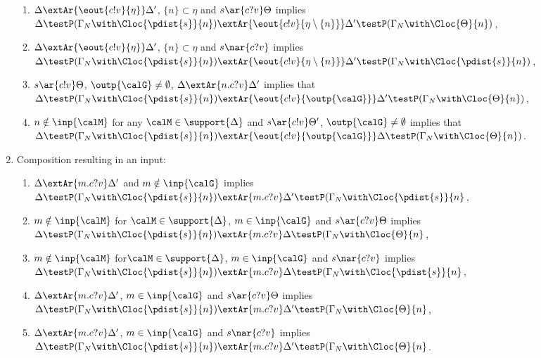 \documentclass{LMCS}
\begin{document}
\begin{prop}
\begin{enumerate}
\begin{enumerate}[label=(\roman*)]
\item $\Delta \extAr{\eout{c!v}{\eta}} \Delta'$, $ 
 \{n\} \subset \eta$  
  and $s \ar{c?v} \Theta$ 
  implies 
  $\Delta \testP (\Gamma_N \with \Cloc{\pdist{s}}{n}) 
  \extAr{\eout{c!v}{\eta \setminus \{n\}}} 
  \Delta' \testP (\Gamma_N \with \Cloc{\Theta}{n})$,

\item $\Delta \extAr{\eout{c!v}{\eta}} \Delta'$, $ 
 \{n\}  \subset \eta$  
  and $s \nar{c?v}$ 
  implies 
  $\Delta \testP (\Gamma_N \with \Cloc{\pdist{s}}{n}) 
  \extAr{\eout{c!v}{\eta \setminus \{n\}}} 
  \Delta' \testP (\Gamma_N \with \Cloc{\pdist{s}}{n})$,

\item $s \ar{c!v} \Theta$, $\outp{\calG} \neq \emptyset$, 
$\Delta \extAr{n.c?v} \Delta'$ implies that 
$\Delta \testP (\Gamma_N \with \Cloc{\pdist{s}}{n}) 
\extAr{\eout{c!v}{\outp{\calG}}} \Delta' \testP (\Gamma_N \with \Cloc{\Theta}{n})$, 

\item $n \notin \inp{\calM}$ for any $\calM \in \support{\Delta}$ 
and $s \ar{c!v} \Theta'$, $\outp{\calG} \neq \emptyset$  implies that 
$\Delta \testP (\Gamma_N \with \Cloc{\pdist{s}}{n}) 
\extAr{\eout{c!v}{\outp{\calG}}} \Delta \testP (\Gamma_N \with \Cloc{\Theta}{n})$. 
\end{enumerate}

\item Composition resulting in an input:
\begin{enumerate}[label=(\roman*)]
\item $\Delta\extAr{m.c?v} \Delta'$ and 
	$m \notin \inp{\calG}$ implies 
	$\Delta \testP (\Gamma_N \with \Cloc{\pdist{s}}{n}) \extAr{m.c?v} 
	\Delta' \testP (\Gamma_N \with \Cloc{\pdist{s}}{n}$, 
	
\item $m \notin \inp{\calM}$ for $\calM \in \support{\Delta}$, 
$m \in \inp{\calG}$ and $s \ar{c?v} \Theta$ 
	implies $\Delta \testP (\Gamma_N \with \Cloc{\pdist{s}}{n}) \extAr{m.c?v} 
	\Delta \testP (\Gamma_N \with \Cloc{\Theta}{n}$,

\item $m \notin \inp{\calM}$ for$\calM \in \support{\Delta}$, 
$m \in \inp{\calG}$ and $s \nar{c?v}$ 
	implies $\Delta \testP (\Gamma_N \with \Cloc{\pdist{s}}{n}) \extAr{m.c?v} 
	\Delta \testP (\Gamma_N \with \Cloc{\pdist{s}}{n}$,

\item $\Delta \extAr{m.c?v} \Delta'$, 
	$m \in \inp{\calG}$ and 
      $s \ar{c?v} \Theta$ 
      implies 
      $\Delta \testP (\Gamma_N \with \Cloc{\pdist{s}}{n}) \extAr{m.c?v} 
	\Delta' \testP (\Gamma_N \with \Cloc{\Theta}{n}$, 

\item $\Delta \extAr{m.c?v} \Delta'$, 
	$m \in \inp{\calG}$ and 
      $s \nar{c?v} $ 
      implies 
      $\Delta \testP (\Gamma_N \with \Cloc{\pdist{s}}{n}) \extAr{m.c?v} 
	\Delta' \testP (\Gamma_N \with \Cloc{\Theta}{n}$.
	\end{enumerate}
  \end{enumerate}
\end{prop}
\end{document}
